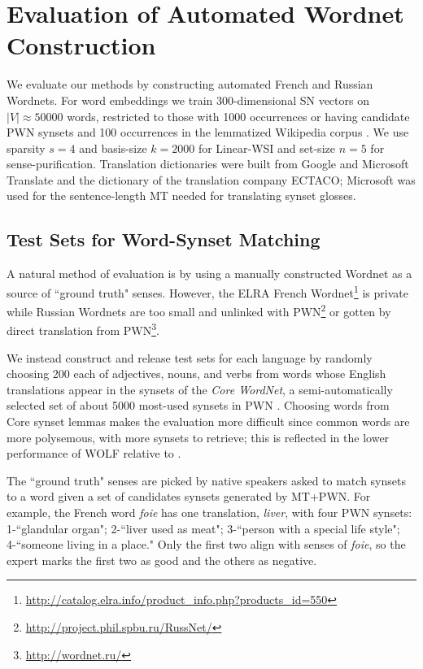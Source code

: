 \documentclass{book}
\begin{document}
\section{Evaluation of Automated Wordnet Construction}
\label{sec:results}

We evaluate our methods by constructing automated French and Russian Wordnets.
For word embeddings we train 300-dimensional SN vectors on $|V|\approx 50000$ words, restricted to those with 1000 occurrences or having candidate PWN synsets and 100 occurrences in the lemmatized Wikipedia corpus \citep{randwalk}.
We use sparsity $s=4$ and basis-size $k=2000$ for Linear-WSI and set-size $n=5$ for sense-purification. 
Translation dictionaries were built from Google and Microsoft Translate and the dictionary of the translation company ECTACO;
Microsoft was used for the sentence-length MT needed for translating synset glosses.

\subsection{Test Sets for Word-Synset Matching}
\label{subsec:testsets}

A natural method of evaluation is by using a manually constructed Wordnet as a source of ``ground truth" senses.
However, the ELRA French Wordnet\footnote{\url{http://catalog.elra.info/product_info.php?products_id=550}} is private while Russian Wordnets are too small and unlinked with PWN\footnote{\url{http://project.phil.spbu.ru/RussNet/}} or gotten by direct translation from PWN\footnote{\url{http://wordnet.ru/}}.

We instead construct and release test sets for each language by randomly choosing 200 each of adjectives, nouns, and verbs from words whose English translations appear in the synsets of the {\em Core WordNet}, a semi-automatically selected set of about 5000 most-used synsets in PWN \citep{Fellbaum:98}. 
Choosing words from Core synset lemmas makes the evaluation more difficult since common words are more polysemous, with more synsets to retrieve;
this is reflected in the lower performance of WOLF relative to \citep[Table 4]{wolf}.

The ``ground truth" senses are picked by native speakers asked to match synsets to a word given a set of candidates synsets generated by MT+PWN.
For example, the French word {\em foie} has one translation, {\em liver}, with four PWN synsets: 
1-``glandular organ"; 2-``liver used as meat"; 3-``person with a special life style"; 4-``someone living in a place." 
Only the first two align with senses of {\em foie}, so the expert marks the first two as good and the others as negative. 
\end{document}
